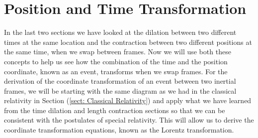 \section{Position and Time Transformation} \label{sect: Position and Time Transformation}

In the last two sections we have looked at the dilation between two different times at the same location and the contraction between two different positions at the same time, when we swap between frames.
Now we will use both these concepts to help us see how the combination of the time and the position coordinate, known as an event, transforms when we swap frames.
For the derivation of the coordinate transformation of an event between two inertial frames, we will be starting with the same diagram as we had in the classical relativity in Section (\ref{sect: Classical Relativity}) and apply what we have learned from the time dilation and length contraction sections so that we can be consistent with the postulates of special relativity.
This will allow us to derive the coordinate transformation equations, known as the Lorentz transformation.


